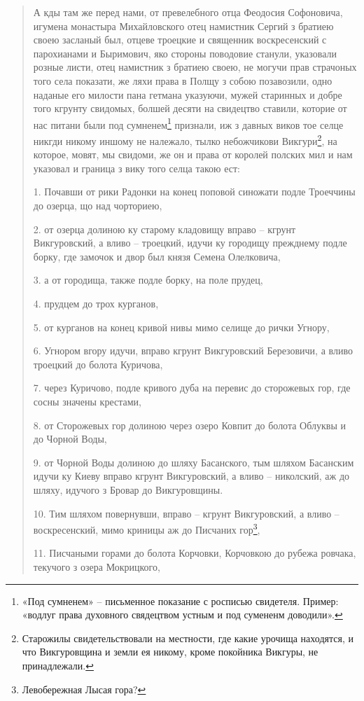 \begin{quotation}
А кды там же перед нами, от превелебного отца Феодосия Софоновича, игумена монастыра Михайловского отец намистник Сергий з братиею своею засланый был, отцеве троецкие и священник воскресенский с парохианами и Быримович, яко стороны поводовие станули, указовали розные листи, отец намистник з братиею своею, не могучи прав страчоных того села показати, же ляхи права в Полщу з собою позавозили, одно наданые его милости пана гетмана указуючи, мужей старинных и добре того кгрунту свидомых, болшей десяти на свидецтво ставили, которие от нас питани были под сумненем\footnote{«Под сумненем» – письменное показание с росписью свидетеля. Пример: «водлуг права духовного свядецтвом устным и под сумененм доводили».} признали, иж з давных виков тое селце никгди никому иншому не належало, тылко небожчикови Викгури\footnote{Старожилы свидетельствовали на местности, где какие урочища находятся, и что Викгуровщина и земли ея никому, кроме покойника Викгуры, не принадлежали.}, на которое, мовят, мы свидоми, же он и права от королей полских мил и нам указовал и граница з вику того селца такою ест:

1. Почавши от рики Радонки на конец поповой синожати подле Троеччины до озерца, що над чорториею,

2. от озерца долиною ку старому кладовищу вправо – кгрунт Викгуровский, а вливо – троецкий, идучи ку городищу прежднему подле борку, где замочок и двор был князя Семена Олелковича,

3. а от городища, также подле борку, на поле прудец, 

4. прудцем до трох курганов, 

5. от курганов на конец кривой нивы мимо селище до рички Угнору,

6. Угнором вгору идучи, вправо кгрунт Викгуровский Березовичи, а вливо троецкий до болота Куричова,

7. через Куричово, подле кривого дуба на перевис до сторожевых гор, где сосны значены крестами, 

8. от Сторожевых гор долиною через озеро Ковпит до болота Облуквы и до Чорной Воды, 

9. от Чорной Воды долиною до шляху Басанского, тым шляхом Басанским идучи ку Киеву вправо кгрунт Викгуровский, а вливо – николский, аж до шляху, идучого з Бровар до Викгуровщины. 

10. Тим шляхом повернувши, вправо – кгрунт Викгуровский, а вливо – воскресенский, мимо криницы аж до Писчаних гор\footnote{Левобережная Лысая гора?},

11. Писчаными горами до болота Корчовки, Корчовкою до рубежа ровчака, текучого з озера Мокрицкого,


\end{quotation}

